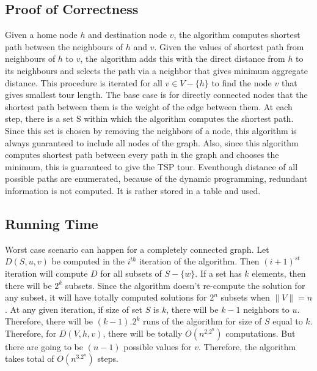 \documentclass{article}
\begin{document}
\subsection{Proof of Correctness}
Given a home node $h$ and destination node $v$, the algorithm computes shortest path between the neighbours of $h$ and $v$. Given the values of shortest path from neighbours of $h$ to $v$, the algorithm adds this with the direct distance from $h$ to its neighbours and selects the path via a neighbor that gives minimum aggregate distance. This procedure is iterated for all $v \in V-\{h\}$ to find the node $v$ that gives smallest tour length. The base case is for directly connected nodes that the shortest path between them is the weight of the edge between them. At each step, there is a set S within which the algorithm computes the shortest path. Since this set is chosen by removing the neighbors of a node, this algorithm is always guaranteed to include all nodes of the graph. Also, since this algorithm computes shortest path between every path in the graph and chooses the minimum, this is guaranteed to give the TSP tour. Eventhough distance of all possible paths are enumerated, because of the dynamic programming, redundant information is not computed. It is rather stored in a table and used. 

\subsection{Running Time}
Worst case scenario can happen for a completely connected graph. Let $D(S,u,v)$ be computed in the $i^{th}$ iteration of the algorithm. Then $(i+1)^{st}$ iteration will compute $D$ for all subsets of $S-\{w\}$. If a set has $k$ elements, then there will be $2^k$ subsets. Since the algorithm doesn't re-compute the solution for any subset, it will have totally computed solutions for $2^n$ subsets when $\|V\|=n$. At any given iteration, if size of set $S$ is $k$, there will be $k-1$ neighbors to $u$. Therefore, there will be $(k-1).2^k$ runs of the algorithm for size of $S$ equal to $k$. Therefore, for $D(V,h,v)$, there will be totally $O(n^2.2^n)$ computations. But there are going to be $(n-1)$ possible values for $v$. Therefore, the algorithm takes total of $O(n^3.2^n)$ steps.
\end{document}
